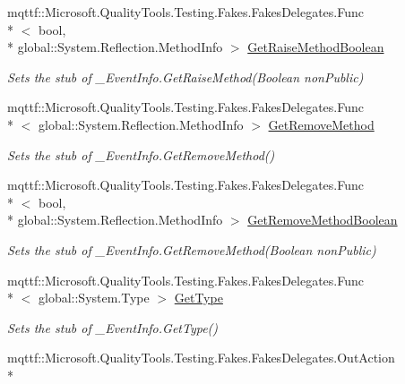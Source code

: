\begin{DoxyCompactItemize}
mqttf\-::\-Microsoft.\-Quality\-Tools.\-Testing.\-Fakes.\-Fakes\-Delegates.\-Func\\*
$<$ bool, \\*
global\-::\-System.\-Reflection.\-Method\-Info $>$ \hyperlink{class_system_1_1_runtime_1_1_interop_services_1_1_fakes_1_1_stub___event_info_aa303b13e58826e816292841c7c1f5cdb}{Get\-Raise\-Method\-Boolean}
\begin{DoxyCompactList}\small\item\em Sets the stub of \-\_\-\-Event\-Info.\-Get\-Raise\-Method(\-Boolean non\-Public)\end{DoxyCompactList}\item 
mqttf\-::\-Microsoft.\-Quality\-Tools.\-Testing.\-Fakes.\-Fakes\-Delegates.\-Func\\*
$<$ global\-::\-System.\-Reflection.\-Method\-Info $>$ \hyperlink{class_system_1_1_runtime_1_1_interop_services_1_1_fakes_1_1_stub___event_info_a3388e6eb0ce18fe4f7c1a57a33a1981a}{Get\-Remove\-Method}
\begin{DoxyCompactList}\small\item\em Sets the stub of \-\_\-\-Event\-Info.\-Get\-Remove\-Method()\end{DoxyCompactList}\item 
mqttf\-::\-Microsoft.\-Quality\-Tools.\-Testing.\-Fakes.\-Fakes\-Delegates.\-Func\\*
$<$ bool, \\*
global\-::\-System.\-Reflection.\-Method\-Info $>$ \hyperlink{class_system_1_1_runtime_1_1_interop_services_1_1_fakes_1_1_stub___event_info_af1867c551e8ecffc2b48c7f5b8c49b60}{Get\-Remove\-Method\-Boolean}
\begin{DoxyCompactList}\small\item\em Sets the stub of \-\_\-\-Event\-Info.\-Get\-Remove\-Method(\-Boolean non\-Public)\end{DoxyCompactList}\item 
mqttf\-::\-Microsoft.\-Quality\-Tools.\-Testing.\-Fakes.\-Fakes\-Delegates.\-Func\\*
$<$ global\-::\-System.\-Type $>$ \hyperlink{class_system_1_1_runtime_1_1_interop_services_1_1_fakes_1_1_stub___event_info_a0ecc162ae66dd8571fe9cb3c1b238f5b}{Get\-Type}
\begin{DoxyCompactList}\small\item\em Sets the stub of \-\_\-\-Event\-Info.\-Get\-Type()\end{DoxyCompactList}\item 
mqttf\-::\-Microsoft.\-Quality\-Tools.\-Testing.\-Fakes.\-Fakes\-Delegates.\-Out\-Action\\*

\end{DoxyCompactItemize}
